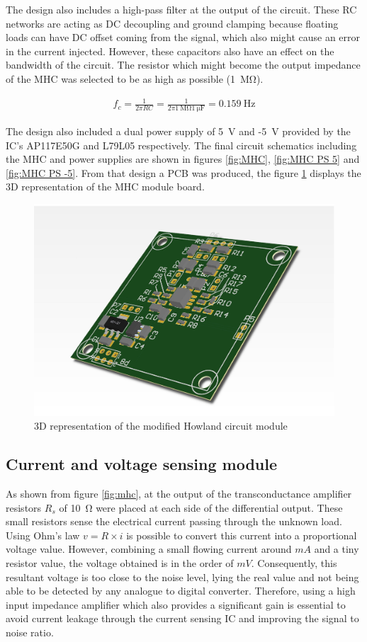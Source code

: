 The design also includes a high-pass filter at the output of the circuit. These RC networks are acting as DC decoupling and ground clamping because floating loads can have DC offset coming from the signal, which also might cause an error in the current injected. However, these capacitors also have an effect on the bandwidth of the circuit. The resistor which might become the output impedance of the MHC was selected to be as high as possible (\SI{1}{\mega\ohm}).

\begin{align}
	\label{eq:MHC filter}
	f_c = \frac{1}{2 \pi R C} = \frac{1}{2 \pi \SI{1}{\mega\ohm} \SI{1}{\micro\farad}} = \SI{0.159}{\hertz}
\end{align}

The design also included a dual power supply of \SI{5}{\volt} and -\SI{5}{\volt} provided by the IC's AP117E50G and L79L05 respectively. The final circuit schematics including the MHC and power supplies are shown in figures \ref{fig:MHC}, \ref{fig:MHC PS 5} and \ref{fig:MHC PS -5}. From that design a PCB was produced, the figure \ref{fig:3D MHC} displays the 3D representation of the MHC module board. 

\begin{figure}[!htpb]
	\centering
	\includegraphics[width=7.5 cm,keepaspectratio]{figure_MHC}
	\caption{3D representation of the modified Howland circuit module}
	\label{fig:3D MHC}
\end{figure}

\subsection{Current and voltage sensing module}
\label{section V&I sense}
As shown from figure \ref{fig:mhc}, at the output of the transconductance amplifier resistors $R_s$ of \SI{10}{\ohm} were placed at each side of the differential output. These small resistors sense the electrical current passing through the unknown load. Using Ohm's law $v=R \times i$ is possible to convert this current into a proportional voltage value. However, combining a small flowing current around $mA$ and a tiny resistor value, the voltage obtained is in the order of $mV$. Consequently, this resultant voltage is too close to the noise level, lying the real value and not being able to be detected by any analogue to digital converter. Therefore, using a high input impedance amplifier which also provides a significant gain is essential to avoid current leakage through the current sensing IC and improving the signal to noise ratio.  

